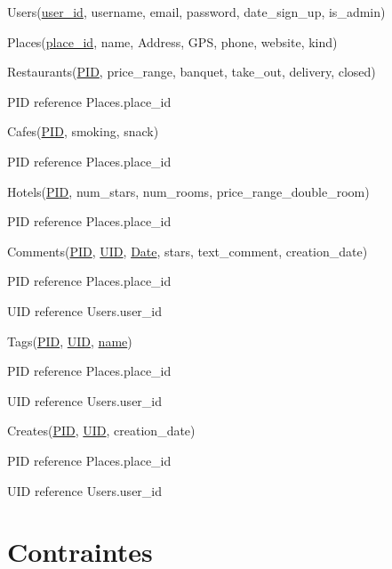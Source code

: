\documentclass[a4paper,10pt]{article}
\begin{document}
\noindent Users(\underline{user\_id}, username, email, password, date\_sign\_up, is\_admin)

\hspace{-0,5cm}Places(\underline{place\_id}, name, Address, GPS, phone, website, kind)

\hspace{-0,5cm}Restaurants(\underline{PID}, price\_range, banquet, take\_out, delivery, closed)

PID reference Places.place\_id

\hspace{-0,5cm}Cafes(\underline{PID}, smoking, snack)

PID reference Places.place\_id

\hspace{-0,5cm}Hotels(\underline{PID}, num\_stars, num\_rooms, price\_range\_double\_room)

PID reference Places.place\_id

\hspace{-0,5cm}Comments(\underline{PID}, \underline{UID}, \underline{Date}, stars, text\_comment, creation\_date)

PID reference Places.place\_id

UID reference Users.user\_id

\hspace{-0,5cm}Tags(\underline{PID}, \underline{UID}, \underline{name})

PID reference Places.place\_id

UID reference Users.user\_id

\hspace{-0,5cm}Creates(\underline{PID}, \underline{UID}, creation\_date)

PID reference Places.place\_id

UID reference Users.user\_id

\section{Contraintes}
\end{document}
